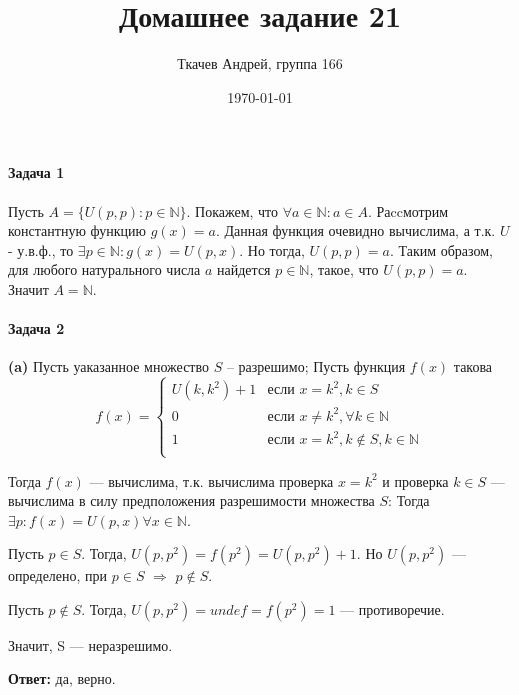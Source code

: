 \documentclass{article}
\title{Домашнее задание 21}
\author{Ткачев Андрей, группа 166}
\date{\today}
\newcommand{\N}{\mathbb{N}}
\begin{document}
    \maketitle
	\paragraph{Задача 1}
		Пусть $A = \{U(p,p) : p\in \N\}$. Покажем, что $\forall a \in \N: a \in A$.
        Раccмотрим константную функцию $g(x) = a$. Данная функция очевидно вычислима, а т.к. $U$ - у.в.ф., то $\exists p\in \N: g(x) = U(p, x)$. Но тогда, $U(p, p) = a$. Таким образом, для любого натурального числа $a$ найдется $p \in \N$, такое, что $U(p, p) = a$. Значит $A = \N$. 
	\paragraph{Задача 2}
		\textbf{(a)} Пусть уаказанное множество $S$ -- разрешимо; Пусть функция $f(x)$ такова 
            \begin{equation*}
             f(x) = 
             \begin{cases} 
               U(k, k^2) + 1 &\text{если $x = k^2, k\in S$}\\
               0 &\text{если $x \ne k^2, \forall k \in \N$} \\
               1 &\text{если $x = k^2, k \notin S, k\in \N$} \\
             \end{cases}
            \end{equation*}

        Тогда $f(x)$ --- вычислима, т.к. вычислима проверка $x = k^2$ и проверка $k \in S$ --- вычислима в силу предположения разрешимости множества $S$:
        Тогда $\exists p: f(x)= U(p, x) \forall x\in \N$. 

        Пусть $p \in S$. Тогда, $U(p, p^2) = f(p^2) = U(p, p^2) + 1$.  Но $U(p, p^2)$ --- определено, при $p \in S$ $\Rightarrow$ $p \notin S$.

        Пусть $p \notin S$. Тогда, $U(p, p^2) = undef = f(p^2) = 1$ ---  противоречие. 

        Значит, S --- неразрешимо.

        \textbf{Ответ:} да, верно.
\end{document}
